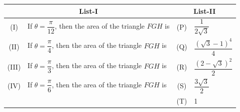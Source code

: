 \documentclass[10pt]{extarticle}
\begin{document}
\begin{center}
\begin{tabular}{|c|p{7cm}|c|l|}
\hline
\multicolumn{2}{|c|}{List-I} & \multicolumn{2}{c|}{List-II} \\
\hline
(I) & If $\theta=\dfrac{\pi}{12}$, then the area of the triangle $FGH$ is & (P) & $\dfrac{1}{2\sqrt3}$ \\
\hline
(II) & If $\theta=\dfrac{\pi}{4}$, then the area of the triangle $FGH$ is & (Q) & $\dfrac{(\sqrt3-1)^4}{4}$ \\
\hline
(III) & If $\theta=\dfrac{\pi}{3}$, then the area of the triangle $FGH$ is & (R) & $\dfrac{(2-\sqrt3)^2}{2}$ \\
\hline
(IV) & If $\theta=\dfrac{\pi}{6}$, then the area of the triangle $FGH$ is & (S) & $\dfrac{3\sqrt3}{2}$ \\
\hline
& & (T) & 1 \\
\hline
\end{tabular}
\end{center}
\end{document}
